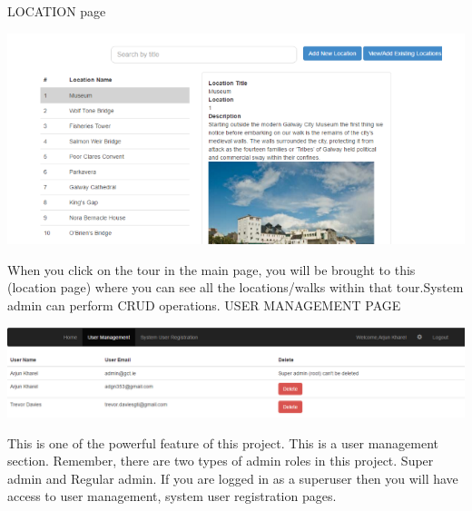 		 		LOCATION page
		 		\begin{center}    
		 			\includegraphics{img/locationPage.PNG}
		 		\end{center}
		 		When you click on the tour in the main page, you will be brought to this (location page) where you can see all the locations/walks within that tour.System admin can perform CRUD operations. 
		 		 	USER MANAGEMENT PAGE
		 			\begin{center}    
		 				\includegraphics{img/userManagement.PNG}
		 			\end{center}
		 		
		 			This is one of the powerful feature of this project. This is a user management section.  Remember, there are two types of admin roles in this project. Super admin and Regular admin. If you are logged in as a superuser then you will have access to user management, system user registration pages.
		 			
